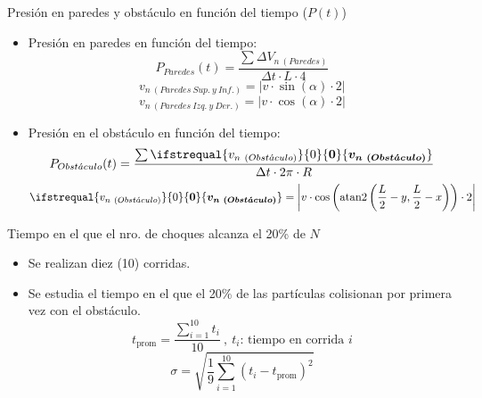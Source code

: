 \documentclass{beamer}
\DeclareMathOperator{\atantwo}{atan2}
\renewcommand\vec[1]{\ifstrequal{#1}{0}{\ensuremath{\mathbf{0}}}{\ensuremath{\boldsymbol{#1}}}}
\begin{document}
            \begin{frame}{Presión en paredes y obstáculo en función del tiempo ($P(t)$)}
                \begin{itemize}
                    \item Presión en paredes en función del tiempo:
                    \begin{equation*}
                        P_{Paredes}(t) = \frac{\sum \Delta V_{n\ (Paredes)}}{\Delta t \cdot L \cdot 4}
                    \end{equation*}
                    \begin{equation*}
                        v_{n\ (Paredes\ Sup.\ y\ Inf.)} = \left| v \cdot \sin(\alpha) \cdot 2 \right|
                    \end{equation*}
                    \begin{equation*}
                        v_{n\ (Paredes\ Izq.\ y\ Der.)} = \left| v \cdot \cos(\alpha) \cdot 2 \right|
                    \end{equation*}
                    \item Presión en el obstáculo en función del tiempo:
                    \begin{equation*}
                        P_{Obst\acute{a}culo}(t) = \frac{\sum \vec{v_{n\ (Obst\acute{a}culo)}}}{\Delta t \cdot 2\pi \cdot R}
                    \end{equation*}
                    \begin{equation*}
                          \vec{v_{n\ (Obst\acute{a}culo)}} = \left| {v \cdot \cos \left( \atantwo \left(\frac{L}{2} - y, \frac{L}{2} - x \right) \right) \cdot 2} \right|
                    \end{equation*}
                \end{itemize}
            \end{frame}

            \begin{frame}{Tiempo en el que el nro. de choques alcanza el 20\% de $N$ }
                \begin{itemize}
                    \item Se realizan diez (10) corridas.
                    \item Se estudia el tiempo en el que el 20\% de las partículas colisionan por primera vez con el obstáculo.
                    \begin{equation*}
                        t_{\text{prom}} = \frac{\sum_{i=1}^{10} t_i}{10} \ ,\ t_i\text{: tiempo en corrida }i
                    \end{equation*}
                    \begin{equation*}
                        \sigma = \sqrt{\frac{1}{9} \sum_{i=1}^{10} (t_i - t_{\text{prom}})^2}
                    \end{equation*}
                \end{itemize}
            \end{frame}
\end{document}
